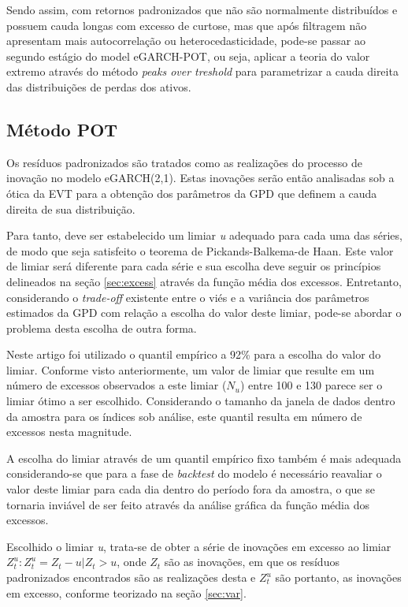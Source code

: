 \documentclass[1p]{elsarticle}
\theoremstyle{definition}
\begin{document}
Sendo assim, com retornos padronizados que não são normalmente distribuídos e possuem cauda longas com excesso de curtose, mas que após filtragem não apresentam mais autocorrelação ou heterocedasticidade, pode-se passar ao segundo estágio do model eGARCH-POT, ou seja, aplicar a teoria do valor extremo através do método \emph{peaks over treshold} para parametrizar a cauda direita das distribuições de perdas dos ativos.

\subsection{Método POT}
\label{sec:metpot}

Os resíduos padronizados são tratados como as realizações do processo de inovação no modelo eGARCH(2,1). Estas inovações serão então analisadas sob a ótica da EVT para a obtenção dos parâmetros da GPD que definem a cauda direita de sua distribuição.

Para tanto, deve ser estabelecido um limiar \emph{u} adequado para cada uma das séries, de modo que seja satisfeito o teorema de Pickands-Balkema-de Haan. Este valor de limiar será diferente para cada série e sua escolha deve seguir os princípios delineados na seção \ref{sec:excess} através da função média dos excessos. Entretanto, considerando o \emph{trade-off} existente entre o viés e a variância dos parâmetros estimados da GPD com relação a escolha do valor deste limiar, pode-se abordar o problema desta escolha de outra forma.

Neste artigo foi utilizado o quantil empírico a 92\% para a escolha do valor do limiar. Conforme visto anteriormente, um valor de limiar que resulte em um número de excessos observados a este limiar ($N_u$) entre 100 e 130 parece ser o limiar ótimo a ser escolhido. Considerando o tamanho da janela de dados dentro da amostra para os índices sob análise, este quantil resulta em número de excessos nesta magnitude.

A escolha do limiar através de um quantil empírico fixo também é mais adequada considerando-se que para a fase de \emph{backtest} do modelo é necessário reavaliar o valor deste limiar para cada dia dentro do período fora da amostra, o que se tornaria inviável de ser feito através da análise gráfica da função média dos excessos.

Escolhido o limiar \emph{u}, trata-se de obter a série de inovações em excesso ao limiar $Z^u_t:{Z^u_t = Z_t-u |Z_t > u}$, onde $Z_t$ são as inovações, em que os resíduos padronizados encontrados são as realizações desta e $Z^u_t$ são portanto, as inovações em excesso, conforme teorizado na seção \ref{sec:var}.
\end{document}
